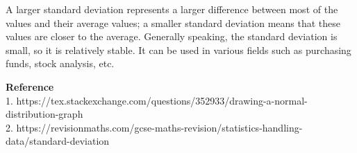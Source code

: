 \documentclass[12pt]{report}
\begin{document}
A larger standard deviation represents a larger difference between most of the values and their average values; a smaller standard deviation means that these values are closer to the average. Generally speaking, the standard deviation is small, so it is relatively stable. It can be used in various fields such as purchasing funds, stock analysis, etc.\\
\begin{small}
\textbf{Reference}\\
1. https://tex.stackexchange.com/questions/352933/drawing-a-normal-distribution-graph\\
2. https://revisionmaths.com/gcse-maths-revision/statistics-handling-data/standard-deviation

\end{small}
\end{document}
